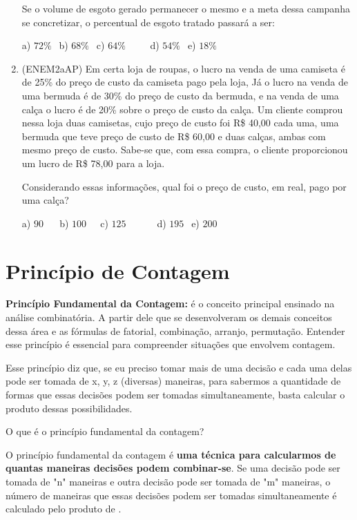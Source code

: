 \begin{multicols*}{2}
\begin{enumerate}
Se o volume de esgoto gerado permanecer o mesmo e a meta dessa campanha se concretizar, o percentual de esgoto tratado passará a ser:

		a) $72\% \ \ $ b) $68\% \ \ $ c) $64\% \ \ \ \ \ \ \ \ \ \ $ d) $54\% \ \ $ e) $18\% \ \ $

		\item (ENEM2aAP) Em certa loja de roupas, o lucro na venda de uma camiseta é de 25\% do preço de custo da camiseta pago pela loja, Já o lucro na venda de uma bermuda é de 30\% do preço de custo da bermuda, e na venda de uma calça o lucro é de 20\% sobre o preço de custo da calça. Um cliente comprou nessa loja duas camisetas, cujo preço de custo foi R\$ 40,00 cada uma, uma bermuda que teve preço de custo de R\$ 60,00 e duas calças, ambas com mesmo
preço de custo. Sabe-se que, com essa compra, o cliente proporcionou um lucro de R\$ 78,00 para a loja.

Considerando essas informações, qual foi o preço de custo, em real, pago por uma calça?

		a) $90 \ \ \ \ \ \ $ b) $100 \ \ \ \ \ $ c) $125 \ \ \ \ \ \ \ \ \ \ \ \ \ $ d) $195 \ \ $ e) $200 \ \ $

		\end{enumerate}
		
		\section*{Princípio de Contagem}
		
		\textbf{Princípio Fundamental da Contagem:} é o  conceito principal ensinado na análise combinatória. A partir dele que se desenvolveram os demais conceitos dessa área e as fórmulas de fatorial, combinação, arranjo, permutação. Entender esse princípio é essencial para compreender situações que envolvem contagem.

Esse princípio diz que, se eu preciso tomar mais de uma decisão e cada uma delas pode ser tomada de x, y, z (diversas) maneiras, para sabermos a quantidade de formas que essas decisões podem ser tomadas simultaneamente, basta calcular o produto dessas possibilidades.

O que é o princípio fundamental da contagem?

O princípio fundamental da contagem é \textbf{uma técnica para calcularmos de quantas maneiras decisões podem combinar-se}. Se uma decisão pode ser tomada de "n" maneiras e outra decisão pode ser tomada de "m" maneiras, o número de maneiras que essas decisões podem ser tomadas simultaneamente é calculado pelo produto de .


\end{multicols*}
